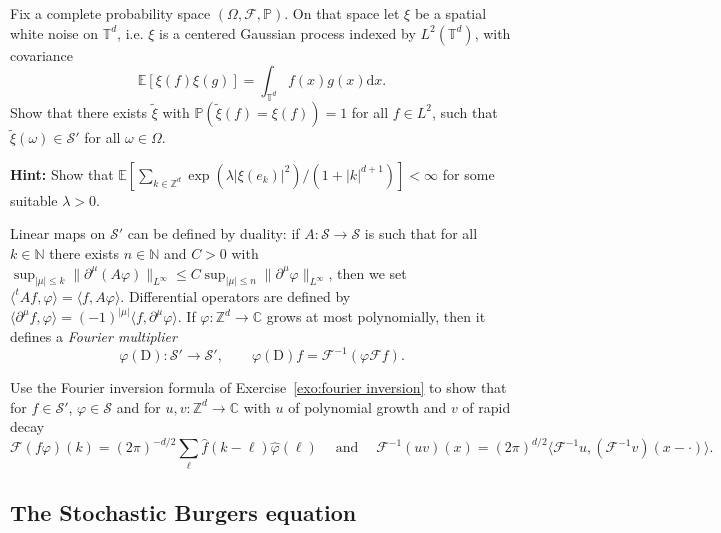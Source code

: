 \documentclass[a4paper,11pt]{article}
\newcommand{\mathD}{\mathrm{D}}
\newcommand{\mathd}{\mathrm{d}}
\newcommand{\tmop}[1]{\ensuremath{\operatorname{#1}}}
\newcommand{\tmtextbf}[1]{{\bfseries{#1}}}
\newcommand{\tmtextit}[1]{{\itshape{#1}}}
\newcommand{\CF}{\mathscr{F}}
\newcommand{\CS}{\mathscr{S}}
\begin{document}
\begin{exercise}
  \label{exo:wn}Fix a complete probability space $(\Omega, \mathcal{F},
  \mathbb{P})$. On that space let $\xi$ be a spatial white noise on
  $\mathbb{T}^d$, i.e. $\xi$ is a centered Gaussian process indexed by $L^2
  (\mathbb{T}^d)$, with covariance
  \[ \mathbb{E} [\xi (f) \xi (g)] = \int_{\mathbb{T}^d} f (x) g (x) \mathd
     x. \]
  Show that there exists $\tilde{\xi}$ with $\mathbb{P} (\tilde{\xi} (f) =
  \xi (f)) = 1$ for all $f \in L^2$, such that $\tilde{\xi} (\omega) \in \CS'$
  for all $\omega \in \Omega$.
  
  \tmtextbf{Hint:} Show that $\mathbb{E} [ \sum_{k \in \mathbb{Z}^d}
  \exp (\lambda | \xi (e_k) |^2) / (1 + | k |^{d + 1}) ] < \infty$ for
  some suitable $\lambda > 0$. 
\end{exercise}

Linear maps on $\CS'$ can be defined by duality: if $A : \CS \rightarrow \CS$
is such that for all $k \in \mathbb{N}$ there exists $n \in \mathbb{N}$ and
$C > 0$ with $\sup_{| {\mu} | \leqslant k} \| \partial^{{\mu}} (A
\varphi) \|_{L^{\infty}} \leqslant C \sup_{| {\mu} | \leqslant n} \|
\partial^{{\mu}} \varphi \|_{L^{\infty}}$, then we set $\langle^t A f,
\varphi \rangle = \langle f, A \varphi \rangle$. Differential operators are
defined by $\langle \partial^{{\mu}} f, \varphi \rangle = (- 1)^{|
{\mu} |} \langle f, \partial^{{\mu}} \varphi \rangle$. If $\varphi :
\mathbb{Z}^d \rightarrow \mathbb{C}$ grows at most polynomially, then it
defines a \tmtextit{Fourier multiplier}
\[
   \varphi (\mathD) : \CS' \rightarrow \CS', \hspace{2em} \varphi (\mathD) f = \CF^{- 1} ( \varphi \CF f ).
\]
\begin{exercise}\label{exercise:convolution}
  Use the Fourier inversion formula of
  Exercise~\ref{exo:fourier inversion} to show that for $f \in \CS'$, $\varphi
  \in \CS$ and for $u, v : \mathbb{Z}^d \rightarrow \mathbb{C}$ with $u$ of
  polynomial growth and $v$ of rapid decay
  \[ \CF (f \varphi) (k) = (2 \pi)^{- d / 2} \sum_{\ell} \hat{f} (k - \ell)
     \hat{\varphi} (\ell) \hspace{1em} \tmop{and} \hspace{1em} \CF^{- 1} (u v)
     (x) = (2 \pi)^{d / 2} \langle \CF^{- 1} u, (\CF^{- 1} v) (x - \cdot)
     \rangle . \]
\end{exercise}


\subsection{The Stochastic Burgers equation}
\end{document}

